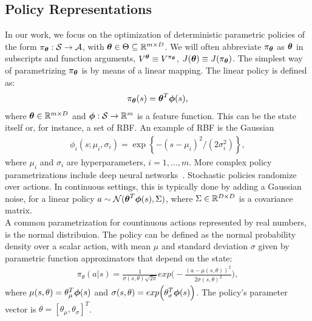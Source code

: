 \subsection{Policy Representations} \label{subsec:polrep}
In our work, we focus on the optimization of deterministic parametric policies of the form $\pi_{\boldsymbol{\theta}}:\mathcal{S}\to\mathcal{A}$, with $\boldsymbol{\theta}\in\Theta\subseteq\mathbb{R}^{m\times D}$. We will often abbreviate $\pi_{\boldsymbol{\theta}}$ as $\boldsymbol{\theta}$ in subscripts and function arguments, \eg $V^{\boldsymbol{\theta}} \equiv V^{\pi_{\boldsymbol{\theta}}}$, $J(\boldsymbol{\theta}) \equiv J(\pi_{\boldsymbol{\theta}})$. The simplest way of parametrizing $\pi_{\boldsymbol{\theta}}$ is by means of a linear mapping. The linear policy is defined as:
\begin{align} \pi_{\boldsymbol{\theta}}(s) = \boldsymbol{\theta}^T\boldsymbol{\phi}(s), \end{align} where $\boldsymbol{\theta}\in\mathbb{R}^{m\times D}$ and $\boldsymbol{\phi}:\mathcal{S}\to\mathbb{R}^m$ is a feature function. This can be the state itself or, for instance, a set of \acf{RBF}. An example of RBF is the Gaussian
\begin{align} \phi_i(s; \mu_i, \sigma_i) = \exp\left\{-{(s -\mu_i)^2}\big/{(2\sigma_i^2)}\right\}, \end{align}
where $\mu_i$ and $\sigma_i$ are hyperparameters, $i=1,\dots,m$. More complex policy parametrizations include deep neural networks~\citep{duan2016benchmarking}. 
Stochastic policies randomize over actions. In continuous settings, this is typically done by adding a Gaussian noise, \eg for a linear policy $a\sim\mathcal{N}(\boldsymbol{\theta}^T\boldsymbol{\phi}(s),\Sigma)$, where $\Sigma\in\mathbb{R}^{D\times D}$ is a covariance matrix.\\
\newline
A common parametrization for countinuous actions represented by real numbers, is the normal distribuion. The policy can be defined as the normal probability density over a scalar action, with mean $\mu$ and standard deviation $\sigma$ given by parametric function approximators that depend on the state:
\begin{align} \pi_{\theta}(a|s) = \frac{1}{\sigma(s, \theta)\sqrt{2\pi}}exp\Big( -\frac{(a -\mu(s, \theta))^2}{2\sigma(s, \theta)^2}\Big), \end{align}
where $\mu(s, \theta) = \theta_{\mu}^{T} \boldsymbol{\phi}(s)$ and $\sigma(s, \theta) = exp\Big( \theta_{\sigma}^{T}\boldsymbol{\phi}(s) \Big)$. The policy's parameter vector is $\theta = [\theta_{\mu}, \theta_{\sigma}]^{T}$. 

